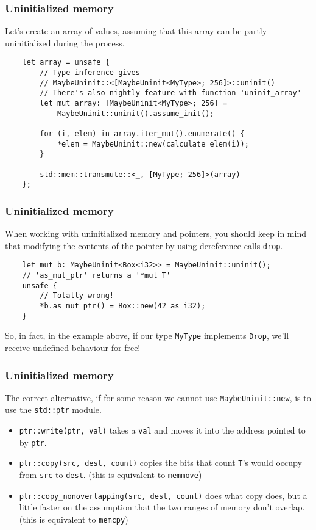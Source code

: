 \documentclass[aspectratio=1610,t]{beamer}
\begin{document}

\begin{frame}[fragile]
\frametitle{Uninitialized memory}
Let's create an array of values, assuming that this array can be partly uninitialized during the process.

\begin{verbatim}
    let array = unsafe {
        // Type inference gives
        // MaybeUninit::<[MaybeUninit<MyType>; 256]>::uninit()
        // There's also nightly feature with function 'uninit_array'
        let mut array: [MaybeUninit<MyType>; 256] =
            MaybeUninit::uninit().assume_init();

        for (i, elem) in array.iter_mut().enumerate() {
            *elem = MaybeUninit::new(calculate_elem(i));
        }

        std::mem::transmute::<_, [MyType; 256]>(array)
    };
\end{verbatim}
\end{frame}


\begin{frame}[fragile]
\frametitle{Uninitialized memory}
When working with uninitialized memory and pointers, you should keep in mind that modifying the contents of the pointer by using dereference calls \texttt{drop}.

\begin{verbatim}
    let mut b: MaybeUninit<Box<i32>> = MaybeUninit::uninit();
    // 'as_mut_ptr' returns a '*mut T'
    unsafe {
        // Totally wrong!
        *b.as_mut_ptr() = Box::new(42 as i32);
    }
\end{verbatim}

So, in fact, in the example above, if our type \texttt{MyType} implements \texttt{Drop}, we'll receive undefined behaviour for free!
\end{frame}


\begin{frame}[fragile]
\frametitle{Uninitialized memory}
The correct alternative, if for some reason we cannot use \texttt{MaybeUninit::new}, is to use the \texttt{std::ptr} module.

\begin{itemize}
    \item<2-> \texttt{ptr::write(ptr, val)} takes a \texttt{val} and moves it into the address pointed to by \texttt{ptr}.
    \item<3-> \texttt{ptr::copy(src, dest, count)} copies the bits that count \texttt{T}'s would occupy from \texttt{src} to \texttt{dest}. (this is equivalent to \texttt{memmove})
    \item<4-> \texttt{ptr::copy\_nonoverlapping(src, dest, count)} does what copy does, but a little faster on the assumption that the two ranges of memory don't overlap. (this is equivalent to \texttt{memcpy})  
\end{itemize}
\end{frame}
\end{document}

